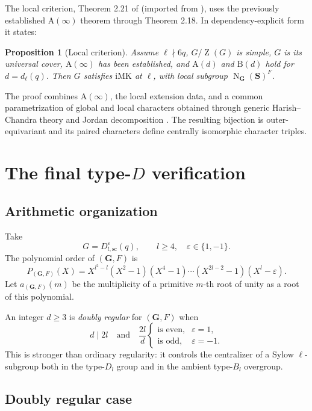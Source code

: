 \documentclass[11pt]{article}
\newtheorem{proposition}[theorem]{Proposition}
\newcommand{\Norm}{\operatorname{N}}
\newcommand{\Z}{\operatorname{Z}}
\newcommand{\IMK}{\mathrm{iMK}}
\newcommand{\Ad}{\mathrm{A}(d)}
\newcommand{\Bd}{\mathrm{B}(d)}
\newcommand{\Ainf}{\mathrm{A}(\infty)}
\newcommand{\G}{\mathbf{G}}
\newcommand{\Sbf}{\mathbf{S}}
\begin{document}
The local criterion, Theorem 2.21 of \cite{CabanesSpath2026} (imported
from \cite{CabanesSpath2019}), uses the previously established
\(\Ainf\) theorem through Theorem 2.18.  In dependency-explicit form it
states:

\begin{proposition}[Local criterion]\label{prop:local-criterion}
Assume \(\ell\nmid 6q\), \(G/\Z(G)\) is simple, \(G\) is its universal
cover, \(\Ainf\) has been established, and \(\Ad\) and \(\Bd\) hold for
\(d=d_\ell(q)\).  Then \(G\) satisfies \(\IMK\) at \(\ell\), with
local subgroup \(\Norm_{\G}(\Sbf)^F\).
\end{proposition}

The proof combines \(\Ainf\), the local extension data, and a common
parametrization of global and local characters obtained through
generic Harish--Chandra theory and Jordan decomposition
\cite{Malle2007,BroueMalleMichel1993}.  The resulting bijection is
outer-equivariant and its paired characters define centrally
isomorphic character triples.

\section{\texorpdfstring{The final type-\(D\) verification}
  {The final type-D verification}}

\subsection{Arithmetic organization}

Take
\[
  G=D_{l,\mathrm{sc}}^\varepsilon(q),
  \qquad l\geq4,\quad \varepsilon\in\{1,-1\}.
\]
The polynomial order of \((\G,F)\) is
\[
 P_{(\G,F)}(X)
 =
 X^{l^2-l}
 (X^2-1)(X^4-1)\cdots(X^{2l-2}-1)(X^l-\varepsilon).
\]
Let \(a_{(\G,F)}(m)\) be the multiplicity of a primitive \(m\)-th root
of unity as a root of this polynomial.

An integer \(d\geq3\) is \emph{doubly regular} for \((\G,F)\) when
\[
  d\mid 2l
  \quad\text{and}\quad
  \frac{2l}{d}
  \begin{cases}
    \text{is even},&\varepsilon=1,\\
    \text{is odd},&\varepsilon=-1.
  \end{cases}
\]
This is stronger than ordinary regularity: it controls the centralizer
of a Sylow \(\ell\)-subgroup both in the type-\(D_l\) group and in the
ambient type-\(B_l\) overgroup.

\subsection{Doubly regular case}
\end{document}
